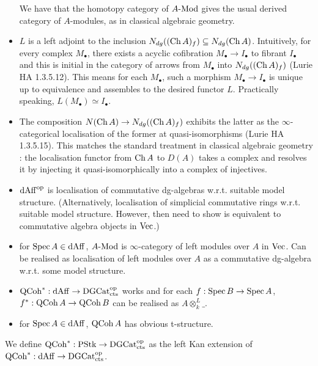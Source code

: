 \documentclass[./main.tex]{subfiles}
\begin{document}
\begin{dfn}
\begin{itemize}
    We have that the homotopy category of $A\text{-}\mathrm{Mod}$ gives the
    usual derived category of $A$-modules, as in classical algebraic geometry.
    \item $L$ is a left adjoint to the inclusion 
    $N_{dg}((\mathrm{Ch}\,A)_f) \subseteq N_{dg}(\mathrm{Ch}\,A)$.
    Intuitively, for every complex $M_\bullet$, 
    there exists a acyclic cofibration $M_\bullet \to I_\bullet$ 
    to fibrant $I_\bullet$
    and this is initial in the category of arrows from 
    $M_\bullet$ into $N_{dg}((\mathrm{Ch}\,A)_f)$
    (Lurie HA 1.3.5.12).
    This means for each $M_\bullet$, 
    such a morphism $M_\bullet \to I_\bullet$ is unique up to equivalence
    and assembles to the desired functor $L$.
    Practically speaking, $L(M_\bullet) \simeq I_\bullet$.
    \item The composition $N(\mathrm{Ch}\, A) \to N_{dg}((\mathrm{Ch}\, A)_f)$
    exhibits the latter as the $\infty$-categorical localisation 
    of the former at quasi-isomorphisms (Lurie HA 1.3.5.15).
    This matches the standard treatment in classical algebraic geometry : 
    the localisation functor from $\mathrm{Ch}\, A$ to $D(A)$
    takes a complex and resolves it by injecting it
    quasi-isomorphically into a complex of injectives.
  \end{itemize}

\end{dfn}

\begin{itemize}
  \item $\mathrm{dAff}^{\mathrm{op}}$ is localisation of commutative dg-algebras w.r.t.
  suitable model structure. 
  (Alternatively, localisation of simplicial commutative rings w.r.t. 
  suitable model structure. However, then need to show
  is equivalent to commutative algebra objects in $\mathrm{Vec}$.)
  \item for $\mathrm{Spec}\,A \in \mathrm{dAff}$, $A\text{-}\mathrm{Mod}$ is
  $\infty$-category of left modules over $A$ in $\mathrm{Vec}$.
  Can be realised as localisation of left modules over
  $A$ as a commutative dg-algebra w.r.t. some model structure.

  \item $\mathrm{QCoh}^* : \mathrm{dAff} \to \mathrm{DGCat}_{\mathrm{cts}}^{\mathrm{op}}$ works
  and for each $f : \mathrm{Spec}\,B \to \mathrm{Spec}\,A$,
  $f^* : \mathrm{QCoh}\,A \to \mathrm{QCoh}\,B$ can be realised as
  $A \otimes^L_k \_$.

  \item for $\mathrm{Spec}\,A \in \mathrm{dAff}$, $\mathrm{QCoh}\,A$ has obvious t-structure.
  
\end{itemize}

\begin{dfn}
  
  We define $\mathrm{QCoh}^* : \mathrm{PStk} \to \mathrm{DGCat}_{\mathrm{cts}}^{\mathrm{op}}$
  as the left Kan extension of $\mathrm{QCoh}^* : \mathrm{dAff} \to \mathrm{DGCat}_{\mathrm{cts}}^{\mathrm{op}}$.
\end{dfn}

\begin{rmk}
  
\end{rmk}
\end{document}
